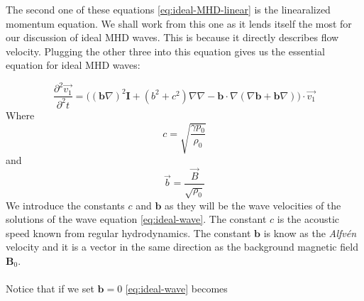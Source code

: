 {\centering 
\noindent {}
\par}

The second one of these equations \autoref{eq:ideal-MHD-linear} is the linearalized momentum equation. We shall work from this one as it lends itself the most for our discussion of ideal MHD waves. This is because it directly describes flow velocity. Plugging the other three into this equation gives us the essential equation for ideal MHD waves:

\begin{equation}
	\label{eq:ideal-wave}		
		\frac{\partial^2 \vec{v_1}}{\partial^2 t} = \bigg( (\textbf{b} \nabla)^2 \textbf{I} + (b^2 + c^2)\nabla \nabla - \textbf{b} \cdot \nabla (\nabla \textbf{b} + \textbf{b} \nabla) \bigg) \cdot \vec{v_1}
\end{equation}
Where
\begin{equation}
	c = \sqrt{ \frac{\gamma p_0}{\rho_0}}
	\label{eq:acoustic-speed}
\end{equation}
and
\begin{equation}
	\vec{b} = \frac{\vec{B}}{\sqrt{\rho_0}}
	\label{eq:Alfven-speed}
\end{equation}
We introduce the constants $c$ and $\textbf{b}$ as they will be the wave velocities of the solutions of the wave equation \autoref{eq:ideal-wave}. 
The constant $c$ is the acoustic speed known from regular hydrodynamics. 
The constant $\textbf{b}$ is know as the \textit{Alfvén } velocity and it is a vector in the same direction as the background magnetic field $\textbf{B}_0$.\\
\\
Notice that if we set $\textbf{b} = 0$ \autoref{eq:ideal-wave} becomes

